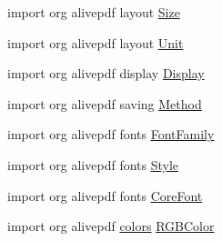 \begin{DoxyCompactItemize}
\item 
import org alivepdf layout \hyperlink{_zero_clipboard_pdf_8as_a173b0241d3ba93c1bc5f6ff7d21bd632}{Size}
\item 
import org alivepdf layout \hyperlink{_zero_clipboard_pdf_8as_a34c3918bea4ec69dea6ea3864319a0bd}{Unit}
\item 
import org alivepdf display \hyperlink{_zero_clipboard_pdf_8as_ac651dfa8758ef75b38151d28803b71ba}{Display}
\item 
import org alivepdf saving \hyperlink{_zero_clipboard_pdf_8as_a2bd9f0e4bed80b4c79bc72a12d1f17e8}{Method}
\item 
import org alivepdf fonts \hyperlink{_zero_clipboard_pdf_8as_a11500dc5adb854adca706aaf2201604b}{Font\+Family}
\item 
import org alivepdf fonts \hyperlink{_zero_clipboard_pdf_8as_af22c559e56786a0e69bbeb3b56ce1ae3}{Style}
\item 
import org alivepdf fonts \hyperlink{_zero_clipboard_pdf_8as_a183616598243889d6077ab7f545062f7}{Core\+Font}
\item 
import org alivepdf \hyperlink{jquery-ui_8js_aedd64c3f92da850b93776c65fd1cced3}{colors} \hyperlink{_zero_clipboard_pdf_8as_a8eb6adf8e00abb38e3285e4615909f13}{R\+G\+B\+Color}
\end{DoxyCompactItemize}


